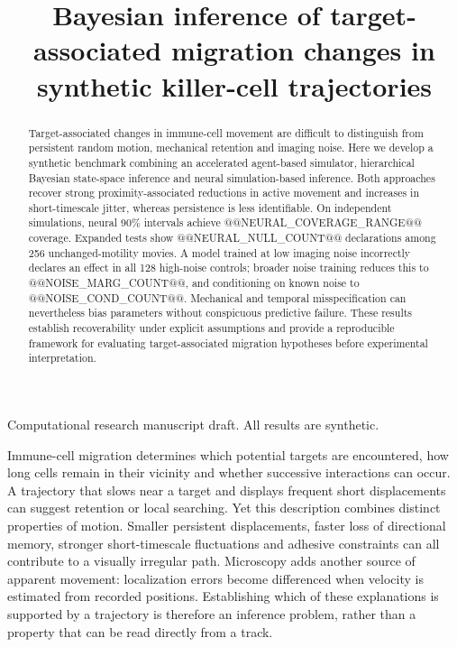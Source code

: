 \documentclass[12pt]{article}
\begin{document}
\title{Bayesian inference of target-associated migration changes in synthetic killer-cell trajectories}
\author{}
\date{}
\maketitle
\begin{center}\small Computational research manuscript draft. All results are synthetic.\end{center}
\begin{abstract}
Target-associated changes in immune-cell movement are difficult to distinguish from persistent random motion, mechanical retention and imaging noise. Here we develop a synthetic benchmark combining an accelerated agent-based simulator, hierarchical Bayesian state-space inference and neural simulation-based inference. Both approaches recover strong proximity-associated reductions in active movement and increases in short-timescale jitter, whereas persistence is less identifiable. On independent simulations, neural 90\% intervals achieve @@NEURAL_COVERAGE_RANGE@@ coverage. Expanded tests show @@NEURAL_NULL_COUNT@@ declarations among 256 unchanged-motility movies. A model trained at low imaging noise incorrectly declares an effect in all 128 high-noise controls; broader noise training reduces this to @@NOISE_MARG_COUNT@@, and conditioning on known noise to @@NOISE_COND_COUNT@@. Mechanical and temporal misspecification can nevertheless bias parameters without conspicuous predictive failure. These results establish recoverability under explicit assumptions and provide a reproducible framework for evaluating target-associated migration hypotheses before experimental interpretation.
\end{abstract}
\clearpage
\linenumbers

Immune-cell migration determines which potential targets are encountered, how long cells remain in their vicinity and whether successive interactions can occur. A trajectory that slows near a target and displays frequent short displacements can suggest retention or local searching. Yet this description combines distinct properties of motion. Smaller persistent displacements, faster loss of directional memory, stronger short-timescale fluctuations and adhesive constraints can all contribute to a visually irregular path. Microscopy adds another source of apparent movement: localization errors become differenced when velocity is estimated from recorded positions. Establishing which of these explanations is supported by a trajectory is therefore an inference problem, rather than a property that can be read directly from a track.
\end{document}
